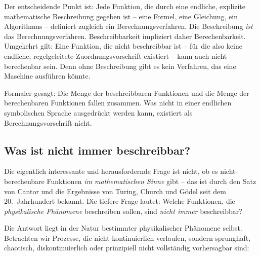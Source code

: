 ﻿\documentclass[12pt, a4paper]{article}
\begin{document}
	Der entscheidende Punkt ist: Jede Funktion, die durch eine endliche, explizite mathematische Beschreibung gegeben ist -- eine Formel, eine Gleichung, ein Algorithmus -- definiert zugleich ein Berechnungsverfahren. Die Beschreibung \textit{ist} das Berechnungsverfahren. Beschreibbarkeit impliziert daher Berechenbarkeit. Umgekehrt gilt: Eine Funktion, die nicht beschreibbar ist -- für die also keine endliche, regelgeleitete Zuordnungsvorschrift existiert -- kann auch nicht berechenbar sein. Denn ohne Beschreibung gibt es kein Verfahren, das eine Maschine ausführen könnte.

	Formaler gesagt: Die Menge der beschreibbaren Funktionen und die Menge der berechenbaren Funktionen fallen zusammen. Was nicht in einer endlichen symbolischen Sprache ausgedrückt werden kann, existiert als Berechnungsvorschrift nicht.

	\subsection{Was ist nicht immer beschreibbar?}

	Die eigentlich interessante und herausfordernde Frage ist nicht, ob es nicht-berechenbare Funktionen \textit{im mathematischen Sinne} gibt -- das ist durch den Satz von Cantor und die Ergebnisse von Turing, Church und Gödel seit dem 20.~Jahrhundert bekannt. Die tiefere Frage lautet: Welche Funktionen, die \textit{physikalische Phänomene} beschreiben sollen, sind \textit{nicht immer} beschreibbar?

	Die Antwort liegt in der Natur bestimmter physikalischer Phänomene selbst. Betrachten wir Prozesse, die nicht kontinuierlich verlaufen, sondern sprunghaft, chaotisch, diskontinuierlich oder prinzipiell nicht vollständig vorhersagbar sind:
\end{document}

